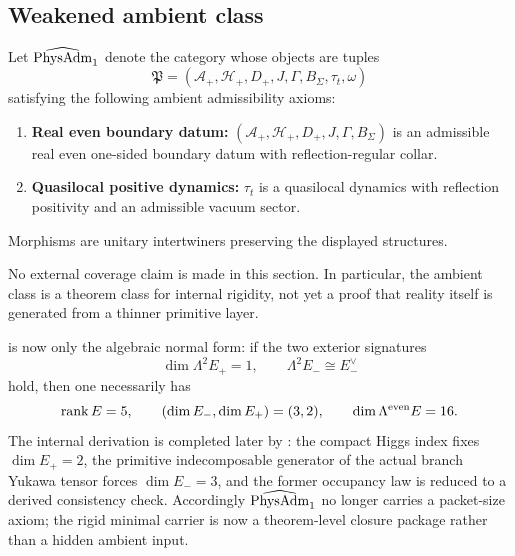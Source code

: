 \subsection{Weakened ambient class}

\begin{definition}
\label{def:physadm}
Let $\widehat{\mathrm{PhysAdm}}_1$ denote the category whose objects are tuples
\[
\mathfrak P=
(\mathcal A_+,\mathcal H_+,D_+,J,\Gamma,B_\Sigma,\tau_t,\omega)
\]
satisfying the following ambient admissibility axioms:
\begin{enumerate}[leftmargin=2em, topsep=3pt, itemsep=3pt]
    \item[\textbf{(U1)}] \textbf{Real even boundary datum:}
    $(\mathcal A_+,\mathcal H_+,D_+,J,\Gamma,B_\Sigma)$ is an admissible real even one-sided
    boundary datum with reflection-regular collar.
    \item[\textbf{(U4)}] \textbf{Quasilocal positive dynamics:}
    $\tau_t$ is a quasilocal dynamics with reflection positivity and an admissible vacuum sector.
\end{enumerate}
Morphisms are unitary intertwiners preserving the displayed structures.
\end{definition}

No external coverage claim is made in this section. In particular, the ambient class is a theorem
class for internal rigidity, not yet a proof that reality itself is generated from a thinner
primitive layer.

\begin{tcolorbox}[colback=orange!5, colframe=orange!70!black, breakable,
    title={Carrier closure is now split cleanly},
    colbacktitle=orange!75!black]
 is now only the algebraic normal form: if the two exterior
signatures
\[
\dim\Lambda^2E_+=1,
\qquad
\Lambda^2E_-\cong E_-^\vee
\]
hold, then one necessarily has
\[
\operatorname{rank} E=5,
\qquad
(\dim E_-,\dim E_+)=(3,2),
\qquad
\dim\Lambda^{\mathrm{even}}E=16.
\]
The internal derivation is completed later by :
the compact Higgs index fixes $\dim E_+=2$, the primitive indecomposable generator of the actual
branch Yukawa tensor forces $\dim E_-=3$, and the former occupancy law is reduced to a derived
consistency check.
Accordingly $\widehat{\mathrm{PhysAdm}}_1$ no longer carries a packet-size axiom; the rigid minimal carrier is now a
theorem-level closure package rather than a hidden ambient input.
\end{tcolorbox}

